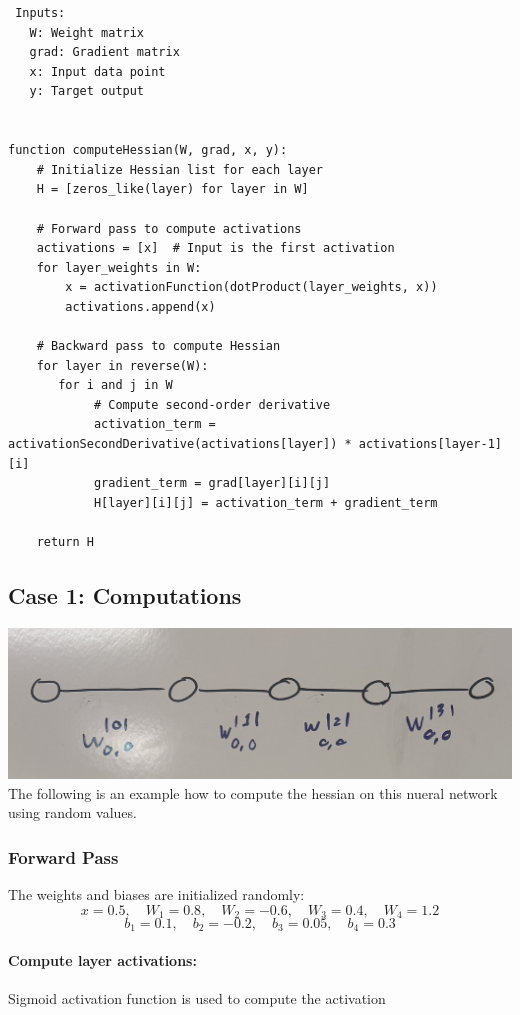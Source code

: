 \documentclass{article}
\begin{document}
\begin{verbatim}
 Inputs:
   W: Weight matrix 
   grad: Gradient matrix 
   x: Input data point
   y: Target output


function computeHessian(W, grad, x, y):
    # Initialize Hessian list for each layer
    H = [zeros_like(layer) for layer in W]

    # Forward pass to compute activations
    activations = [x]  # Input is the first activation
    for layer_weights in W:
        x = activationFunction(dotProduct(layer_weights, x))
        activations.append(x)

    # Backward pass to compute Hessian
    for layer in reverse(W):
       for i and j in W
            # Compute second-order derivative
            activation_term = activationSecondDerivative(activations[layer]) * activations[layer-1][i]
            gradient_term = grad[layer][i][j]
            H[layer][i][j] = activation_term + gradient_term

    return H

\end{verbatim}

\subsection{Case 1: Computations}
\includegraphics[scale=0.1]{../figs/Case 1.png} \\[0.5cm]

The following is an example how to compute the hessian on this nueral network using random values.

\subsubsection{Forward Pass}
The weights and biases are initialized randomly:
\[
x = 0.5, \quad W_1 = 0.8, \quad W_2 = -0.6, \quad W_3 = 0.4, \quad W_4 = 1.2
\]
\[
b_1 = 0.1, \quad b_2 = -0.2, \quad b_3 = 0.05, \quad b_4 = 0.3
\]
\paragraph{Compute layer activations:} Sigmoid activation function is used to compute the activation
\end{document}
